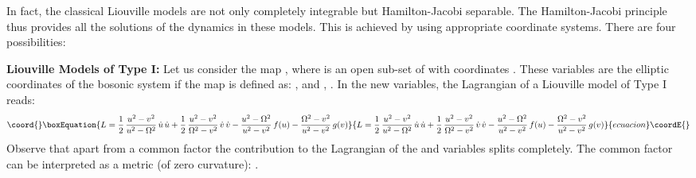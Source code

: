 \documentclass[a4paper,11pt,twoside]{article}
\def\r{\mathbb R}                   %
\begin{document}
In fact, the classical Liouville models are not only completely
integrable but Hamilton-Jacobi separable. The Hamilton-Jacobi
principle thus provides all the solutions of the dynamics in these
models. This is achieved by using appropriate coordinate systems.
There are four possibilities:

\vspace*{0.1cm}

\noindent \myHighlight{$\bullet$}\coordHE{} {\bf Liouville Models of Type I:} Let us consider the map \myHighlight{$\xi^*:D
\longrightarrow {\r}^2$}\coordHE{}, where \coordHE{} is an open sub-set of \myHighlight{${\r}^2$}\coordHE{} with coordinates \coordHE{}. These variables are the elliptic
coordinates of the bosonic system if the map is defined as:
\coordHE{}, \coordHE{} and
 \myHighlight{$u \in [\Omega,\infty)$}\coordHE{}, \coordHE{}.
In the new variables, the Lagrangian  of a Liouville model of Type
I reads:
\begin{equation}\coord{}\boxEquation{
L = \displaystyle\frac{1}{2}\, \displaystyle\frac{u^2-v^2}{u^2-\Omega^2} \, \dot{u}\, \dot{u}+ \displaystyle\frac{1}{2} \, \displaystyle\frac{u^2-v^2}{\Omega^2-v^2} \, \dot{v}\, \dot{v}
- \displaystyle\frac{u^2-\Omega^2}{u^2-v^2} \,  f(u)-\displaystyle\frac{\Omega^2-v^2}{u^2-v^2} \, g(v)
\label{eq:Liou1}
}{
L = \displaystyle\frac{1}{2}\, \displaystyle\frac{u^2-v^2}{u^2-\Omega^2} \, \dot{u}\, \dot{u}+ \displaystyle\frac{1}{2} \, \displaystyle\frac{u^2-v^2}{\Omega^2-v^2} \, \dot{v}\, \dot{v}
- \displaystyle\frac{u^2-\Omega^2}{u^2-v^2} \,  f(u)-\displaystyle\frac{\Omega^2-v^2}{u^2-v^2} \, g(v)
}{ecuacion}\coordE{}\end{equation}
Observe that apart from a common factor the contribution to the
Lagrangian of the \coordHE{} and \coordHE{} variables splits completely. The
common factor can be interpreted as a metric (of zero curvature):
\coordHE{}.

\vspace*{0.1cm}
\end{document}
